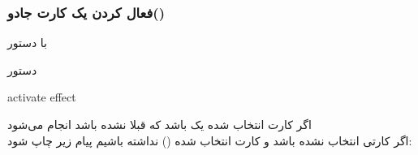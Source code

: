 \documentclass[]{article}
\begin{document}
\subsubsection*{{\titr فعال کردن یک کارت جادو()}}
با دستور
\begin{mybox}[colback=yellow]{دستور}
	\begin{latin}	
	    activate effect	
	\end{latin}
\end{mybox}
اگر کارت انتخاب شده یک  باشد که قبلا  نشده باشد انجام 
می‌شود
\\
    اگر کارتی انتخاب نشده باشد و کارت انتخاب شده () نداشته 
    باشیم پیام زیر چاپ شود:
\end{document}
